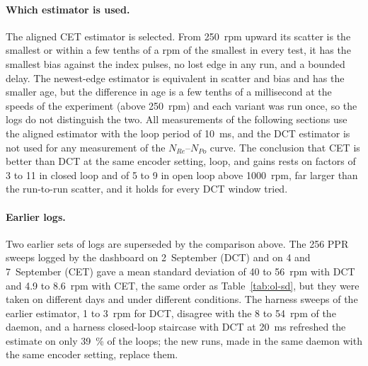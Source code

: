\paragraph{Which estimator is used.}
The aligned CET estimator is selected. From 250~rpm upward its scatter is the smallest or within a few tenths of a rpm of the smallest in every test, it has the smallest bias against the index pulses, no lost edge in any run, and a bounded delay. The newest-edge estimator is equivalent in scatter and bias and has the smaller age, but the difference in age is a few tenths of a millisecond at the speeds of the experiment (above 250~rpm) and each variant was run once, so the logs do not distinguish the two. All measurements of the following sections use the aligned estimator with the loop period of 10~ms, and the DCT estimator is not used for any measurement of the $N_{Re}$--$N_{Po}$ curve. The conclusion that CET is better than DCT at the same encoder setting, loop, and gains rests on factors of 3 to 11 in closed loop and of 5 to 9 in open loop above 1000~rpm, far larger than the run-to-run scatter, and it holds for every DCT window tried.

\paragraph{Earlier logs.}
Two earlier sets of logs are superseded by the comparison above. The 256 PPR sweeps logged by the dashboard on 2~September (DCT) and on 4 and 7~September (CET) gave a mean standard deviation of 40 to 56~rpm with DCT and 4.9 to 8.6~rpm with CET, the same order as Table~\ref{tab:ol-sd}, but they were taken on different days and under different conditions. The harness sweeps of the earlier estimator, 1 to 3~rpm for DCT, disagree with the 8 to 54~rpm of the daemon, and a harness closed-loop staircase with DCT at 20~ms refreshed the estimate on only 39~\% of the loops; the new runs, made in the same daemon with the same encoder setting, replace them.

